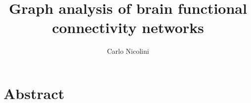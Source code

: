 
%

\title{Graph analysis of brain functional connectivity networks}
\author{Carlo Nicolini}

\newtheorem{obs}{Observation}
\newtheorem{props}{Proposition}
\newenvironment{bottompar}{\par\vspace*{\fill}}{\clearpage}




\maketitle
{}

\tableofcontents
\listoftodos

%

%

%


\chapter*{Abstract}


% 	

% 	

